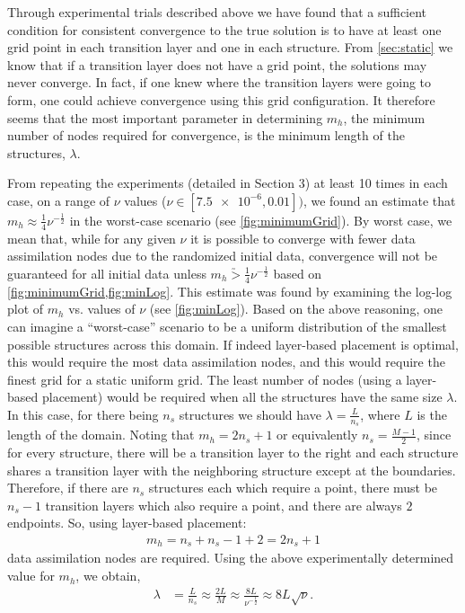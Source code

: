 \documentclass[12pt]{amsart}
\theoremstyle{plain}
\theoremstyle{definition}
\theoremstyle{remark}
\numberwithin{equation}{section} %
\numberwithin{figure}{section}   %
\begin{document}
Through experimental trials described above we have found that a sufficient condition for consistent convergence to the true solution is to have at least one grid point in each transition layer and one in each structure. From \cref{sec:static} we know that if a transition layer does not have a grid point, the solutions may never converge. In fact, if one knew where the transition layers were going to form, one could achieve convergence using this grid configuration. It therefore seems that the most important parameter in determining $m_h$, the minimum number of nodes required for convergence, is the minimum length of the structures, $\lambda$. 


From repeating the experiments (detailed in Section 3) at least 10 times in each case, on a range of $\nu$ values ($\nu \in [\num{7.5e-6},\num{0.01}])$, we found an estimate that $m_h \approx \frac{1}{4}\nu^{-\frac{1}{2}}$ in the worst-case scenario (see \cref{fig:minimumGrid}). By worst case, we mean that, while for any given $\nu$ it is possible to converge with fewer data assimilation nodes due to the randomized initial data, convergence will not be guaranteed for all initial data unless $m_h\utilde{>} \frac{1}{4}\nu^{-\frac{1}{2}}$ based on \cref{fig:minimumGrid,fig:minLog}. This estimate was found by examining the log-log plot of $m_h$ vs. values of $\nu$ (see \cref{fig:minLog}).  Based on the above reasoning, one can imagine a ``worst-case'' scenario to be a uniform distribution of the smallest possible structures across this domain. If indeed layer-based placement is optimal, this would require the most data assimilation nodes, and this would require the finest grid for a static uniform grid. The least number of nodes (using a layer-based placement) would be required when all the structures have the same size $\lambda$. In this case, for there being $n_s$ structures we should have $\lambda = \frac{L}{n_s} $, where $L$ is the length of the domain. Noting that $m_h = 2n_s + 1$ or equivalently $n_s = \frac{M-1}{2}$, since for every structure, there will be a transition layer to the right and each structure shares a transition layer with the neighboring structure except at the boundaries. Therefore, if there are $n_s$ structures each which require a point, there must be $n_s - 1$ transition layers which also require a point, and there are always $2$ endpoints. So, using layer-based placement: 
\begin{align*}
m_h = n_s +n_s-1 +2 = 2n_s + 1
\end{align*} data assimilation nodes are required. Using the above experimentally determined value for $m_h$, we obtain,
\begin{align*}
\lambda & = \frac{L}{n_s} \approx\frac{2L}{M} \approx\frac{8L}{\nu^{-\frac{1}{2}}} \approx 8L\sqrt{\nu}.
\end{align*}
\end{document}
